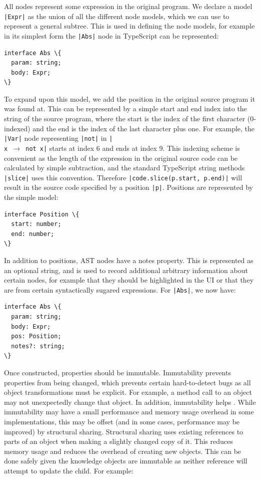 \documentclass[a4paper,fleqn,oneside,12pt]{report}
\begin{document}
All nodes represent some expression in the original program. We declare a model \texttt{|Expr|} as the union of all the different node models, which we can use to represent a general subtree. This is used in defining the node models, for example in its simplest form the \texttt{|Abs|} node in TypeScript can be represented:

\begin{verbatim}
interface Abs \{
  param: string;
  body: Expr;
\}
\end{verbatim}

To expand upon this model, we add the position in the original source program it was found at. This can be represented by a simple start and end index into the string of the source program, where the start is the index of the first character (0-indexed) and the end is the index of the last character plus one. For example, the \texttt{|Var|} node representing \texttt{|not|} in \texttt{|\\x $\rightarrow$ not x|} starts at index 6 and ends at index 9. This indexing scheme is convenient as the length of the expression in the original source code can be calculated by simple subtraction, and the standard TypeScript string methods \texttt{|slice|} uses this convention. Therefore \texttt{|code.slice(p.start, p.end)|} will result in the source code specified by a position \texttt{|p|}. Positions are represented by the simple model:

\begin{verbatim}
interface Position \{
  start: number;
  end: number;
\}
\end{verbatim}

In addition to positions, AST nodes have a notes property. This is represented as an optional string, and is used to record additional arbitrary information about certain nodes, for example that they should be highlighted in the UI or that they are from certain syntactically sugared expressions. For \texttt{|Abs|}, we now have:

\begin{verbatim}
interface Abs \{
  param: string;
  body: Expr;
  pos: Position;
  notes?: string;
\}
\end{verbatim}

Once constructed, properties should be immutable. Immutability prevents properties from being changed, which prevents certain hard-to-detect bugs as all object transformations must be explicit. For example, a method call to an object may not unexpectedly change that object. In addition, immutability helps . While immutability may have a small performance and memory usage overhead in some implementations, this may be offset (and in some cases, performance may be improved) by structural sharing. Structural sharing uses existing references to parts of an object when making a slightly changed copy of it. This reduces memory usage and reduces the overhead of creating new objects. This can be done safely given the knowledge objects are immutable as neither reference will attempt to update the child. For example:
\end{document}
